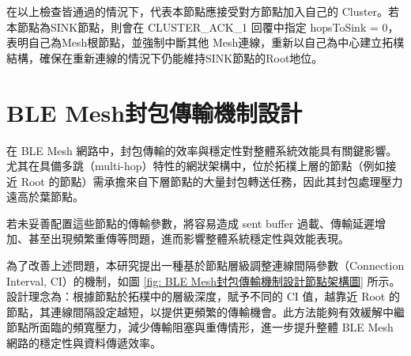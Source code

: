 \begin{ZhChapter}
在以上檢查皆通過的情況下，代表本節點應接受對方節點加入自己的 Cluster。若本節點為SINK節點，則會在 CLUSTER\_ACK\_1 回覆中指定 hopsToSink = 0，表明自己為Mesh根節點，並強制中斷其他 Mesh連線，重新以自己為中心建立拓樸結構，確保在重新連線的情況下仍能維持SINK節點的Root地位。

\section{BLE Mesh封包傳輸機制設計}
在 BLE Mesh 網路中，封包傳輸的效率與穩定性對整體系統效能具有關鍵影響。尤其在具備多跳（multi-hop）特性的網狀架構中，位於拓樸上層的節點（例如接近 Root 的節點）需承擔來自下層節點的大量封包轉送任務，因此其封包處理壓力遠高於葉節點。

若未妥善配置這些節點的傳輸參數，將容易造成 sent buffer 過載、傳輸延遲增加、甚至出現頻繁重傳等問題，進而影響整體系統穩定性與效能表現。

為了改善上述問題，本研究提出一種基於節點層級調整連線間隔參數（Connection Interval, CI）的機制，如圖 \ref{fig: BLE Mesh封包傳輸機制設計節點架構圖} 所示。設計理念為：根據節點於拓樸中的層級深度，賦予不同的 CI 值，越靠近 Root 的節點，其連線間隔設定越短，以提供更頻繁的傳輸機會。此方法能夠有效緩解中繼節點所面臨的頻寬壓力，減少傳輸阻塞與重傳情形，進一步提升整體 BLE Mesh 網路的穩定性與資料傳遞效率。


\end{ZhChapter}
